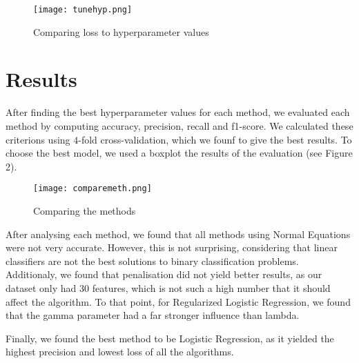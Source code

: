 \documentclass{article}
\begin{document}
	\begin{figure}\label{fig1}
		\centering
		\texttt{[image: tunehyp.png]}
		\caption{Comparing loss to hyperparameter values}
	\end{figure}
	
	
	
	\section{Results}
	After finding the best hyperparameter values for each method, we evaluated each method by computing accuracy, precision, recall and f1-score. We calculated these criterions using $4$-fold cross-validation, which we founf to give the best results. To choose the best model, we used a boxplot the results of the evaluation (see Figure 2).
	
	\begin{figure}[h]
		\centering
		\texttt{[image: comparemeth.png]}
		\caption{Comparing the methods}
	\end{figure}

	After analysing each method, we found that all methods using Normal Equations were not very accurate. However, this is not surprising, considering that linear classifiers are not the best solutions to binary classification problems. Additionaly, we found that penalisation did not yield better results, as our dataset only had $30$ features, which is not such a high number that it should affect the algorithm. To that point, for Regularized Logistic Regression, we found that the gamma parameter had a far stronger influence than lambda.
	
	Finally, we found the best method to be Logistic Regression, as it yielded the highest precision and lowest loss of all the algorithms.
\end{document}
